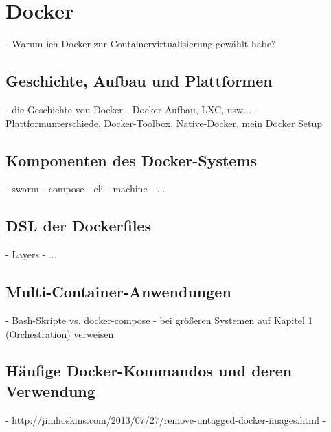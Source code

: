 \chapter{Docker}
\label{cha:docker}
- Warum ich Docker zur Containervirtualisierung gewählt habe?
\section{Geschichte, Aufbau und Plattformen}
\label{sec:docker-basics}
- die Geschichte von Docker
- Docker Aufbau, LXC, usw...
- Plattformunterschiede, Docker-Toolbox, Native-Docker, mein Docker Setup
\section{Komponenten des Docker-Systems}
\label{sec:docker-komponenten}
- swarm
- compose
- cli
- machine
- ...
\section{DSL der Dockerfiles}
\label{sec:dockerfiles}
- Layers
- ...
\section{Multi-Container-Anwendungen}
\label{sec:docker-multi-container-anwendungen}
- Bash-Skripte vs. docker-compose
- bei größeren Systemen auf Kapitel 1 (Orchestration) verweisen
\section{Häufige Docker-Kommandos und deren Verwendung}
\label{docker-verwendung}
- http://jimhoskins.com/2013/07/27/remove-untagged-docker-images.html
- 